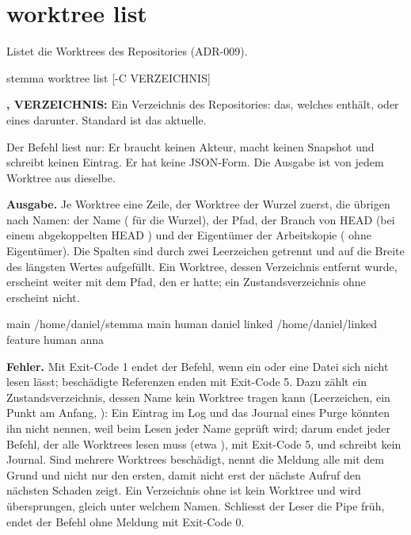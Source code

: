 \section{worktree list}

Listet die Worktrees des Repositories (ADR-009).

\starttyping
stemma worktree list [-C VERZEICHNIS]
\stoptyping

\startitemize
\item {\bf {},  VERZEICHNIS:} Ein Verzeichnis des Repositories:
das, welches  enthält, oder eines darunter. Standard ist das aktuelle.
\stopitemize

Der Befehl liest nur: Er braucht keinen Akteur, macht keinen Snapshot und schreibt keinen
Eintrag. Er hat keine JSON-Form. Die Ausgabe ist von jedem Worktree aus dieselbe.

{\bf Ausgabe.} Je Worktree eine Zeile, der Worktree der Wurzel zuerst, die übrigen nach Namen:
der Name ( für die Wurzel), der Pfad, der Branch von HEAD (bei einem abgekoppelten HEAD
) und der Eigentümer der Arbeitskopie (\type{-} ohne Eigentümer). Die
Spalten sind durch zwei Leerzeichen getrennt und auf die Breite des längsten Wertes aufgefüllt.
Ein Worktree, dessen Verzeichnis entfernt wurde, erscheint weiter mit dem Pfad, den er hatte;
ein Zustandsverzeichnis ohne  erscheint nicht.

\starttyping
main    /home/daniel/stemma    main     human daniel
linked  /home/daniel/linked    feature  human anna
\stoptyping

{\bf Fehler.} Mit Exit-Code 1 endet der Befehl, wenn ein  oder eine Datei
 sich nicht lesen lässt; beschädigte Referenzen enden mit Exit-Code 5.
Dazu zählt ein Zustandsverzeichnis, dessen Name kein Worktree tragen kann (Leerzeichen, ein
Punkt am Anfang, ): Ein Eintrag im Log und das Journal eines Purge könnten ihn nicht
nennen, weil beim Lesen jeder Name geprüft wird; darum endet jeder Befehl, der alle Worktrees
lesen muss (etwa ), mit Exit-Code 5, und
 schreibt kein Journal.
Sind mehrere Worktrees beschädigt, nennt die Meldung alle mit dem Grund und nicht nur den ersten,
damit nicht erst der nächste Aufruf den nächsten Schaden zeigt.
Ein Verzeichnis ohne  ist kein Worktree und wird übersprungen, gleich unter welchem
Namen.
Schliesst der Leser die Pipe früh, endet der Befehl ohne Meldung mit Exit-Code 0.

